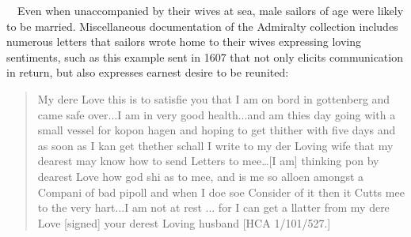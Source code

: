 \documentclass[12pt]{article}
\newenvironment{styleStandard}{\renewcommand\baselinestretch{1.0}\setlength\leftskip{0cm}\setlength\rightskip{0cm plus 1fil}\setlength\parindent{0cm}\setlength\parfillskip{0pt plus 1fil}\setlength\parskip{0in plus 1pt}\writerlistparindent\writerlistleftskip\leavevmode\normalfont\normalsize\writerlistlabel\ignorespaces}{\unskip\vspace{0in plus 1pt}\par}
\newcommand\writerlistleftskip{}
\newcommand\writerlistparindent{}
\newcommand\writerlistlabel{}
\begin{document}
\begin{styleStandard}
\ \ Even when unaccompanied by their wives at sea, male sailors of age were likely to be married. Miscellaneous documentation of the Admiralty collection includes numerous letters that sailors wrote home to their wives expressing loving sentiments, such as this example sent in 1607 that not only elicits communication in return, but also expresses earnest desire to be reunited:
\end{styleStandard}


\begin{quotation}
My dere Love this is to satisfie you that I am on bord in gottenberg and came safe over...I am in very good health...and am thies day going with a small vessel for kopon hagen and hoping to get thither with five days and as soon as I kan get thether schall I write to my der Loving wife that my dearest may know how to send Letters to mee…[I am] thinking pon by dearest Love how god shi as to mee, and is me so alloen amongst a Compani of bad pipoll and when I doe soe Consider of it then it Cutts mee to the very hart...I am not at rest ... for I can get a llatter from my dere Love [signed] your derest Loving husband [HCA 1/101/527.]

\end{quotation}
\end{document}
